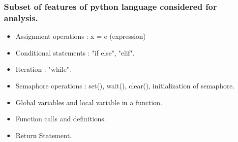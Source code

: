 	\subsubsection{\textbf{Subset of features of python language considered for analysis.}}
	\begin{itemize}
		\item Assignment operations : x = e (expression)
		\item Conditional statements : "if else", "elif". \item Iteration : "while".
		\item Semaphore operations : set(), wait(), clear(), initialization of semaphore.
		\item Global variables and local variable in a function.
		\item Function calls and definitions.
		\item Return Statement.	 
	\end{itemize}
	
